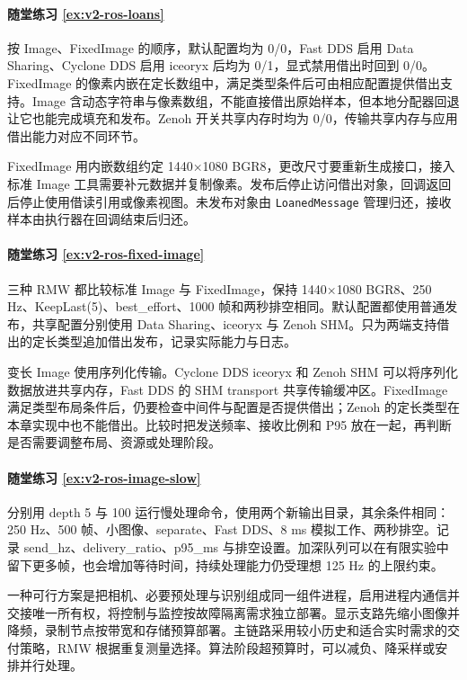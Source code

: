 \paragraph*{随堂练习 \ref{ex:v2-ros-loans}}
\begin{solution}
按 Image、FixedImage 的顺序，默认配置均为 0/0，Fast DDS 启用 Data Sharing、Cyclone DDS 启用 iceoryx 后均为 0/1，显式禁用借出时回到 0/0。FixedImage 的像素内嵌在定长数组中，满足类型条件后可由相应配置提供借出支持。Image 含动态字符串与像素数组，不能直接借出原始样本，但本地分配器回退让它也能完成填充和发布。Zenoh 开关共享内存时均为 0/0，传输共享内存与应用借出能力对应不同环节。

FixedImage 用内嵌数组约定 1440×1080 BGR8，更改尺寸要重新生成接口，接入标准 Image 工具需要补元数据并复制像素。发布后停止访问借出对象，回调返回后停止使用借读引用或像素视图。未发布对象由 \texttt{LoanedMessage} 管理归还，接收样本由执行器在回调结束后归还。
\end{solution}

\paragraph*{随堂练习 \ref{ex:v2-ros-fixed-image}}
\begin{solution}
三种 RMW 都比较标准 Image 与 FixedImage，保持 1440×1080 BGR8、250 Hz、KeepLast(5)、best\_effort、1000 帧和两秒排空相同。默认配置都使用普通发布，共享配置分别使用 Data Sharing、iceoryx 与 Zenoh SHM。只为两端支持借出的定长类型追加借出发布，记录实际能力与日志。

变长 Image 使用序列化传输。Cyclone DDS iceoryx 和 Zenoh SHM 可以将序列化数据放进共享内存，Fast DDS 的 SHM transport 共享传输缓冲区。FixedImage 满足类型布局条件后，仍要检查中间件与配置是否提供借出；Zenoh 的定长类型在本章实现中也不能借出。比较时把发送频率、接收比例和 P95 放在一起，再判断是否需要调整布局、资源或处理阶段。
\end{solution}

\paragraph*{随堂练习 \ref{ex:v2-ros-image-slow}}
\begin{solution}
分别用 depth 5 与 100 运行慢处理命令，使用两个新输出目录，其余条件相同：250 Hz、500 帧、小图像、separate、Fast DDS、8 ms 模拟工作、两秒排空。记录 send\_hz、delivery\_ratio、p95\_ms 与排空设置。加深队列可以在有限实验中留下更多帧，也会增加等待时间，持续处理能力仍受理想 125 Hz 的上限约束。

一种可行方案是把相机、必要预处理与识别组成同一组件进程，启用进程内通信并交接唯一所有权，将控制与监控按故障隔离需求独立部署。显示支路先缩小图像并降频，录制节点按带宽和存储预算部署。主链路采用较小历史和适合实时需求的交付策略，RMW 根据重复测量选择。算法阶段超预算时，可以减负、降采样或安排并行处理。
\end{solution}

